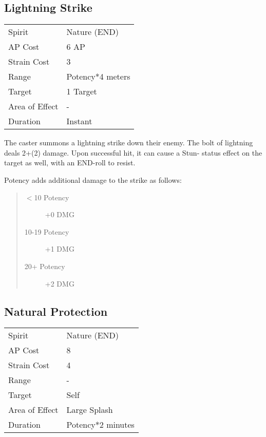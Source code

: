 \documentclass[11pt,a4paper,twocolumn]{book}
\begin{document}
\subsection*{Lightning Strike}
{
	\begin{tabu} to 70mm{| X[l,4] | X[l,7] |}
		\hline
		Spirit         & Nature (END)          \\
		AP Cost        & 6 AP                  \\
		Strain Cost    & 3                     \\
		Range          & Potency*4 meters \\
		Target         & 1 Target              \\
		Area of Effect & -                     \\
		Duration       & Instant               \\ \hline
	\end{tabu}
	
}
\medskip

The caster summons a lightning strike down their enemy. The bolt of lightning deals 2+(2) damage. Upon successful hit, it can cause a Stun- status effect on the target as well, with an END-roll to resist.

Potency adds additional damage to the strike as follows:
\begin{quote}
	\begin{description}
		\item[$<$10 Potency] 	+0 DMG
		\item[10-19 Potency] 	+1 DMG
		\item[20+ Potency]  	+2 DMG
	\end{description}	
\end{quote}

\subsection*{Natural Protection}
{
	\begin{tabu} to 70mm{| X[l,4] | X[l,7] |}
		\hline
		Spirit         & Nature (END)      \\
		AP Cost        & 8                 \\
		Strain Cost    & 4                 \\
		Range          & -                 \\
		Target         & Self              \\
		Area of Effect & Large Splash      \\
		Duration       & Potency*2 minutes \\ \hline
	\end{tabu}
	
}
\medskip
\end{document}
